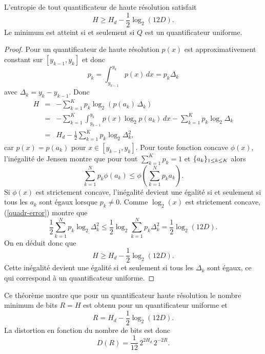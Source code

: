 \begin{theorem}
\label{quanti-theo}
L'entropie de
tout quantificateur de haute r\'esolution satisfait
\begin{equation}
\label{lower-quantX}
H \geq H_d - \frac 1 2 \log_2 (12 D) .
\end{equation}
Le minimum est atteint si et seulement si $Q$ est un
quantificateur uniforme.
\end{theorem}
\begin{proof}
Pour un quantificateur de haute r\'esolution
$p(x)$ est approximativement constant sur $[y_{k-1},y_k]$
et donc
\[
p_k = \int_{y_{k-1}}^{y_k} p(x)\,dx = p_k \Delta_k
\]
avec $\Delta_k = y_k - y_{k-1}$.
Donc
\begin{eqnarray*}
H & = & - \sum_{k=1}^K p_k \log_2 (p(a_k)\, \Delta_k )\\
& = &- \sum_{k=1}^K \int_{y_{k-1}}^{y_k} p(x) \log_2 p(a_k)\, dx
- \sum_{k=1}^K p_k \log_2 \Delta_k \\
& = & H_d - \frac 1 2 \sum_{k=1}^K p_k \log_2 \Delta_k^2 ,
\end{eqnarray*}
car $p(x) = p(a_k)$ pour $x \in [y_{k-1},y_k]$.
Pour toute fonction concave $\phi (x)$, l'in\'egalit\'e de Jensen
montre que pour tout $\sum_{k=1}^K p_k = 1$
et $\{a_k \}_{ 1 \leq k \leq K}$ alors
\begin{equation}
\label{jensen}
\sum_{k=1}^N p_k \phi ( a_k) \leq \phi(\sum_{k=1}^N  p_k a_k) .
\end{equation}
Si $\phi (x)$ est strictement concave, l'in\'egalit\'e devient une \'egalit\'e
si et seulement si tous les $a_k$ sont \'egaux lorsque
$p_k \neq 0$. Comme $\log_2(x)$ est strictement concave,
(\ref{quadr-error}) montre que
\[
 \frac 1 2 \sum_{k=1}^N p_k \log_2 \Delta_k^2 \leq
 \frac 1 2 \log_2 \sum_{k=1}^N p_k \Delta_k^2 =
 \frac 1 2 \log_2 (12 D ) .
\]
On en d\'eduit donc que
\[
H \geq H_d - \frac 1 2 \log_2 (12 D ).
\]
Cette in\'egalit\'e devient une \'egalit\'e si et seulement si tous les
$\Delta_k$ sont \'egaux, ce qui correspond \`a un quantificateur
uniforme.
\end{proof}
Ce th\'eor\`eme montre que pour un quantificateur haute r\'esolution
le nombre minimum de bits
$R = H$ est obtenu pour un quantificateur uniforme et
\begin{equation}
\label{bit-rate-uniform}
R = H_d -  \frac 1 2 \log_2 (12 D ).
\end{equation}
La distortion en fonction du nombre de bits est donc
\[
D(R) = \frac 1 {12}\, 2^{2 H_d} \,2^{-2R} .
\]
